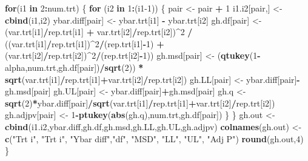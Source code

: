 \documentclass[
]{book}
\newenvironment{Shaded}{\begin{snugshade}}{\end{snugshade}}
\newcommand{\ControlFlowTok}[1]{\textcolor[rgb]{0.13,0.29,0.53}{\textbf{#1}}}
\newcommand{\DecValTok}[1]{\textcolor[rgb]{0.00,0.00,0.81}{#1}}
\newcommand{\FunctionTok}[1]{\textcolor[rgb]{0.13,0.29,0.53}{\textbf{#1}}}
\newcommand{\NormalTok}[1]{#1}
\newcommand{\OtherTok}[1]{\textcolor[rgb]{0.56,0.35,0.01}{#1}}
\newcommand{\SpecialCharTok}[1]{\textcolor[rgb]{0.81,0.36,0.00}{\textbf{#1}}}
\newcommand{\StringTok}[1]{\textcolor[rgb]{0.31,0.60,0.02}{#1}}
\begin{document}
\begin{Shaded}
\begin{Highlighting}[]
\ControlFlowTok{for}\NormalTok{(i1 }\ControlFlowTok{in} \DecValTok{2}\SpecialCharTok{:}\NormalTok{num.trt) \{}
  \ControlFlowTok{for}\NormalTok{ (i2 }\ControlFlowTok{in} \DecValTok{1}\SpecialCharTok{:}\NormalTok{(i1}\DecValTok{{-}1}\NormalTok{)) \{}
\NormalTok{    pair }\OtherTok{\textless{}{-}}\NormalTok{ pair }\SpecialCharTok{+} \DecValTok{1}
\NormalTok{    i1.i2[pair,] }\OtherTok{\textless{}{-}} \FunctionTok{cbind}\NormalTok{(i1,i2)}
\NormalTok{    ybar.diff[pair] }\OtherTok{\textless{}{-}}\NormalTok{ ybar.trt[i1] }\SpecialCharTok{{-}}\NormalTok{ ybar.trt[i2]}
\NormalTok{    gh.df[pair] }\OtherTok{\textless{}{-}} 
\NormalTok{      (var.trt[i1]}\SpecialCharTok{/}\NormalTok{rep.trt[i1] }\SpecialCharTok{+}\NormalTok{ var.trt[i2]}\SpecialCharTok{/}\NormalTok{rep.trt[i2])}\SpecialCharTok{\^{}}\DecValTok{2} \SpecialCharTok{/} 
\NormalTok{      ((var.trt[i1]}\SpecialCharTok{/}\NormalTok{rep.trt[i1])}\SpecialCharTok{\^{}}\DecValTok{2}\SpecialCharTok{/}\NormalTok{(rep.trt[i1]}\SpecialCharTok{{-}}\DecValTok{1}\NormalTok{) }\SpecialCharTok{+} 
\NormalTok{       (var.trt[i2]}\SpecialCharTok{/}\NormalTok{rep.trt[i2])}\SpecialCharTok{\^{}}\DecValTok{2}\SpecialCharTok{/}\NormalTok{(rep.trt[i2]}\SpecialCharTok{{-}}\DecValTok{1}\NormalTok{))}
\NormalTok{    gh.msd[pair] }\OtherTok{\textless{}{-}} 
\NormalTok{      (}\FunctionTok{qtukey}\NormalTok{(}\DecValTok{1}\SpecialCharTok{{-}}\NormalTok{alpha,num.trt,gh.df[pair])}\SpecialCharTok{/}\FunctionTok{sqrt}\NormalTok{(}\DecValTok{2}\NormalTok{)) }\SpecialCharTok{*}
      \FunctionTok{sqrt}\NormalTok{(var.trt[i1]}\SpecialCharTok{/}\NormalTok{rep.trt[i1]}\SpecialCharTok{+}\NormalTok{var.trt[i2]}\SpecialCharTok{/}\NormalTok{rep.trt[i2])}
\NormalTok{    gh.LL[pair] }\OtherTok{\textless{}{-}}\NormalTok{ ybar.diff[pair]}\SpecialCharTok{{-}}\NormalTok{gh.msd[pair]}
\NormalTok{    gh.UL[pair] }\OtherTok{\textless{}{-}}\NormalTok{ ybar.diff[pair]}\SpecialCharTok{+}\NormalTok{gh.msd[pair]}
\NormalTok{    gh.q }\OtherTok{\textless{}{-}} \FunctionTok{sqrt}\NormalTok{(}\DecValTok{2}\NormalTok{)}\SpecialCharTok{*}\NormalTok{ybar.diff[pair]}\SpecialCharTok{/}\FunctionTok{sqrt}\NormalTok{(var.trt[i1]}\SpecialCharTok{/}\NormalTok{rep.trt[i1]}\SpecialCharTok{+}\NormalTok{var.trt[i2]}\SpecialCharTok{/}\NormalTok{rep.trt[i2])}
\NormalTok{    gh.adjpv[pair] }\OtherTok{\textless{}{-}} \DecValTok{1}\SpecialCharTok{{-}}\FunctionTok{ptukey}\NormalTok{(}\FunctionTok{abs}\NormalTok{(gh.q),num.trt,gh.df[pair])}
\NormalTok{    \}}
\NormalTok{  \}}
\NormalTok{gh.out }\OtherTok{\textless{}{-}} \FunctionTok{cbind}\NormalTok{(i1.i2,ybar.diff,gh.df,gh.msd,gh.LL,gh.UL,gh.adjpv)}
\FunctionTok{colnames}\NormalTok{(gh.out) }\OtherTok{\textless{}{-}} \FunctionTok{c}\NormalTok{(}\StringTok{"Trt i"}\NormalTok{, }\StringTok{"Trt i\textquotesingle{}"}\NormalTok{, }\StringTok{"Ybar diff"}\NormalTok{,}\StringTok{"df"}\NormalTok{, }\StringTok{"MSD"}\NormalTok{, }\StringTok{"LL"}\NormalTok{, }\StringTok{"UL"}\NormalTok{, }\StringTok{"Adj P"}\NormalTok{)}
\FunctionTok{round}\NormalTok{(gh.out,}\DecValTok{4}\NormalTok{)}
\NormalTok{\}}


\end{Highlighting}
\end{Shaded}
\end{document}
